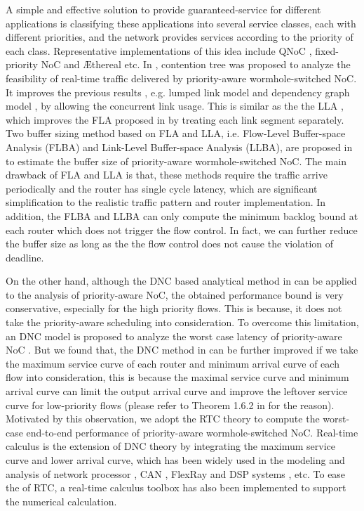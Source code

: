 \documentclass[10pt,journal]{IEEEtran}
\begin{document}
A simple and effective solution to provide guaranteed-service for different applications is classifying these applications into several service classes, each with different priorities, and the network provides services according to the priority of each class. Representative implementations of this idea include QNoC \cite{BCGK04}, fixed-priority NoC \cite{Shi:2008:RCA:1397757.1397996} and {{\AE}thereal} \cite{GoDR05} etc. In \cite{LuJS05}, contention tree was proposed to analyze the feasibility of real-time traffic delivered by priority-aware wormhole-switched NoC. It improves the previous results , e.g. lumped link model \cite{707545} and dependency graph model \cite{708526}, by allowing the concurrent link usage. This is similar as the the LLA \cite{73}, which improves the FLA proposed in \cite{Shi:2008:RCA:1397757.1397996} by treating each link segment separately. Two buffer sizing method based on FLA and LLA, i.e. Flow-Level Buffer-space Analysis (FLBA) and Link-Level Buffer-space Analysis (LLBA), are proposed in \cite{189} to estimate the buffer size of priority-aware wormhole-switched NoC. The main drawback of FLA and LLA is that, these methods require the traffic arrive periodically and the router has single cycle latency, which are significant simplification to the realistic traffic pattern and router implementation. In addition, the FLBA and LLBA can only compute the minimum backlog bound at each router which does not trigger the flow control. In fact, we can further reduce the buffer size as long as the the flow control does not cause the violation of deadline.

On the other hand, although the DNC based analytical method in  \cite{qian2009analysis} can be applied to the analysis of priority-aware NoC, the obtained performance bound is very conservative, especially for the high priority flows. This is because, it does not take the priority-aware scheduling into consideration. To overcome this limitation, an DNC model is proposed to analyze the worst case latency of priority-aware NoC \cite{Qian489900}. But we found that, the DNC method in \cite{Qian489900} can be further improved if we take the maximum service curve of each router and minimum arrival curve of each flow into consideration, this is because the maximal service curve and minimum arrival curve can limit the output arrival curve and improve the leftover service curve for low-priority flows (please refer to Theorem 1.6.2 in \cite{Boudec2001Network} for the reason). Motivated by this observation, we adopt the RTC theory \cite{1253607} to compute the worst-case end-to-end performance of priority-aware wormhole-switched NoC. Real-time calculus is the extension of DNC theory by integrating the maximum service curve and lower arrival curve, which has been widely used in the modeling and analysis of network processor \cite{1253838}, CAN \cite{4617308}, FlexRay \cite{Hagiescu:2007:PAF:1278480.1278554} and DSP systems \cite{thiele2005performance}, etc. To ease the of RTC, a real-time calculus toolbox \cite{rtc} has also been implemented to support the numerical calculation.
\end{document}
